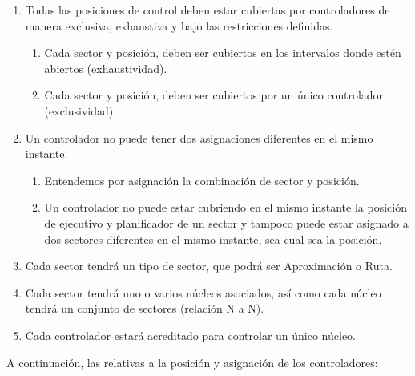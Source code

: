 \begin{enumerate}[label={\textbf{RD\arabic*}}, ref={RD\arabic*},  align=left]
	
	\item \label{RD:controlador-por-cada-turno} Todas las posiciones de control deben estar cubiertas por controladores de manera exclusiva, exhaustiva y bajo las restricciones definidas.
	\begin{enumerate}[label*={\textbf{.\arabic*}}]
		\item Cada sector y posición, deben ser cubiertos en los intervalos donde estén abiertos (exhaustividad).
		\item Cada sector y posición, deben ser cubiertos por un único controlador (exclusividad).
	\end{enumerate}
	
	\item Un controlador no puede tener dos asignaciones diferentes en el mismo instante.
	\begin{enumerate}[label*={\textbf{.\arabic*}}]
		\item Entendemos por asignación la combinación de sector y posición.
		\item Un controlador no puede estar cubriendo en el mismo
		instante la posición de ejecutivo y planificador de un sector y tampoco puede estar
		asignado a dos sectores diferentes en el mismo instante, sea cual sea la posición.
	\end{enumerate}
	
	\item \label{RD:tipos-sector}  Cada sector tendrá un tipo de sector, que podrá ser Aproximación o Ruta.
	
	\item  \label{RD:sector-nucleo} Cada sector tendrá uno o varios núcleos asociados, así como cada núcleo tendrá un conjunto de sectores (relación N a N).
	
	\item \label{RD:nucleo-controlador} Cada controlador estará acreditado para controlar un único núcleo.
	
\end{enumerate}



A continuación, las relativas a la posición y asignación de los controladores:

